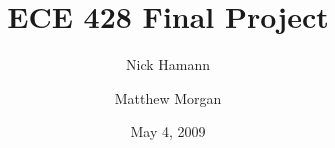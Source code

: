 \documentclass[]{report}
\title{ECE 428 Final Project}
\author{Nick Hamann \and Matthew Morgan}
\date{May 4, 2009}
\begin{document}
\maketitle





\begin{appendix}

\end{appendix}
\end{document}
